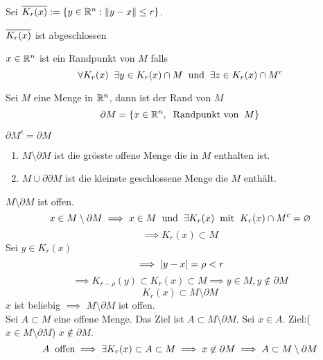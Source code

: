 \begin{Def}
  Sei $\overline{K_r(x)}:=\left\{ y\in\mathbb{R}^n:\left\| y-x \right\|\leq r \right\}$.
\end{Def}
\begin{Ueb}
  $\overline{K_r(x)}$ ist abgeschlossen
\end{Ueb}
\begin{Def}
  $x\in\mathbb{R}^n$ ist ein Randpunkt von $M$ falls
  \[\forall K_r(x)\hspace{2mm}\exists y\in K_r(x)\cap M\hspace{2mm}\text{und}\hspace{2mm} \exists z\in K_r(x)\cap M^c\]
\end{Def}
\begin{Def}
  Sei $M$ eine Menge in $\mathbb{R}^n$, dann ist der Rand von $M$
  \[\partial M=\left\{ x\in\mathbb{R}^n, \hspace{2mm}\text{Randpunkt von}\hspace{2mm} M \right\}\]
\end{Def}
\begin{Sat}
  $\partial M^c=\partial M$
  \begin{enumerate}
    \item $M\setminus \partial M$ ist die grösste offene Menge die in $M$ enthalten ist.
    \item $M\cup \partial \partial M$ ist die kleinste geschlossene Menge die $M$ enthält.
  \end{enumerate}
\end{Sat}
\begin{Bew}
  $M\setminus \partial M$ ist offen. 
  \[x\in M\setminus \partial M \implies x\in M\hspace{2mm}\text{und}\hspace{2mm} \exists K_r(x)\hspace{2mm}\text{mit}\hspace{2mm} K_r(x)\cap M^c=\varnothing\]
  \[\implies K_r(x)\subset M\]
  Sei $y\in K_r(x)$
  \[\implies \left| y-x \right|=\rho<r\]
  \[\implies K_{r-\rho}(y)\subset K_r(x)\subset M\implies y\in M,y\not\in \partial M\]
  \[K_r(x)\subset M\setminus \partial M\]
  $x$ ist beliebig $\implies$ $M\setminus \partial M$ ist offen.\\
  Sei $A\subset M$ eine offene Menge. Das Ziel ist $A\subset M\setminus\partial M$. Sei $x\in A$. Ziel:($x\in M\setminus\partial M$) $x\not\in \partial M$.
  \[A\hspace{2mm}\text{offen}\implies \exists K_r(x)\subset A\subset M\implies x\not\in \partial M\implies A\subset M\setminus\partial M\]
\end{Bew}
